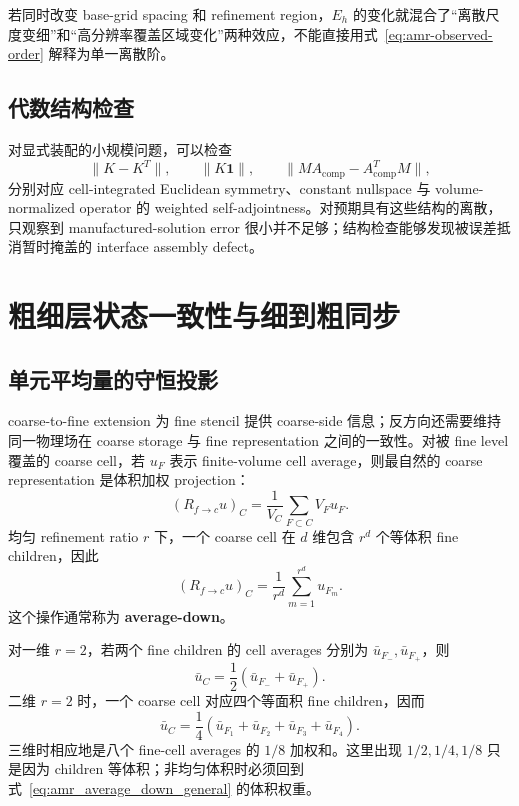若同时改变 base-grid spacing 和 refinement region，$E_h$ 的变化就混合了“离散尺度变细”和“高分辨率覆盖区域变化”两种效应，不能直接用式~\eqref{eq:amr-observed-order} 解释为单一离散阶。

\subsection{代数结构检查}

对显式装配的小规模问题，可以检查
\begin{equation}
\|K-K^T\|,
\qquad
\|K\bm1\|,
\qquad
\|MA_{\mathrm{comp}}-A_{\mathrm{comp}}^TM\|,
\label{eq:amr-operator-structure-checks}
\end{equation}
分别对应 cell-integrated Euclidean symmetry、constant nullspace 与 volume-normalized operator 的 weighted self-adjointness。对预期具有这些结构的离散，只观察到 manufactured-solution error 很小并不足够；结构检查能够发现被误差抵消暂时掩盖的 interface assembly defect。

\section{粗细层状态一致性与细到粗同步}
\label{sec:amr-average-down}

\subsection{单元平均量的守恒投影}

coarse-to-fine extension 为 fine stencil 提供 coarse-side 信息；反方向还需要维持同一物理场在 coarse storage 与 fine representation 之间的一致性。对被 fine level 覆盖的 coarse cell，若 $u_F$ 表示 finite-volume cell average，则最自然的 coarse representation 是体积加权 projection：
\begin{equation}
\boxed{
(R_{f\rightarrow c}u)_C
=
\frac{1}{V_C}
\sum_{F\subset C}V_Fu_F.
}
\label{eq:amr_average_down_general}
\end{equation}
均匀 refinement ratio $r$ 下，一个 coarse cell 在 $d$ 维包含 $r^d$ 个等体积 fine children，因此
\begin{equation}
(R_{f\rightarrow c}u)_C
=
\frac{1}{r^d}
\sum_{m=1}^{r^d}u_{F_m}.
\label{eq:amr_average_down_uniform}
\end{equation}
这个操作通常称为 \textbf{average-down}。

对一维 $r=2$，若两个 fine children 的 cell averages 分别为 $\bar u_{F_-},\bar u_{F_+}$，则
\begin{equation}
\boxed{
\bar u_C
=\frac12\left(\bar u_{F_-}+\bar u_{F_+}\right).
}
\label{eq:amr-average-down-r2-1d}
\end{equation}
二维 $r=2$ 时，一个 coarse cell 对应四个等面积 fine children，因而
\begin{equation}
\boxed{
\bar u_C
=\frac14
\left(
\bar u_{F_1}+\bar u_{F_2}+\bar u_{F_3}+\bar u_{F_4}
\right).
}
\label{eq:amr-average-down-r2-2d}
\end{equation}
三维时相应地是八个 fine-cell averages 的 $1/8$ 加权和。这里出现 $1/2,1/4,1/8$ 只是因为 children 等体积；非均匀体积时必须回到式~\eqref{eq:amr_average_down_general} 的体积权重。

